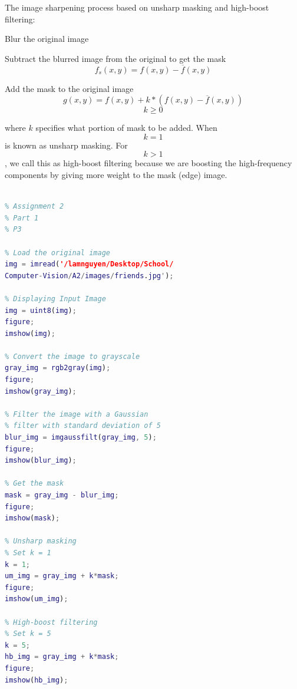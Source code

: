 \documentclass[conference]{IEEEtran}
\begin{document}
The image sharpening process based on unsharp masking and high-boost filtering:
\begin{description}[font=$\bullet$~\normalfont\scshape\color{red!50!black}]
  \item Blur the original image
  \item Subtract the blurred image from the original to get the mask
  \[ f_s(x, y) = f(x, y) - \overline{f}(x, y) \]
  \item Add the mask to the original image
  \[ g(x, y) = f(x, y) +  k*(f(x, y) - \overline{f}(x, y)) \]
  \[ k \geq 0 \]
\end{description}

where \(k\) specifies what portion of mask to be added. When \[ k = 1 \] is known as unsharp masking. For \[ k > 1 \], we call this as high-boost filtering because we are boosting the high-frequency components by giving more weight to the mask (edge) image. 

\begin{lstlisting}[language=Matlab]

% Assignment 2
% Part 1
% P3

% Load the original image
img = imread('/lamnguyen/Desktop/School/
Computer-Vision/A2/images/friends.jpg');

% Displaying Input Image
img = uint8(img);
figure; 
imshow(img); 

% Convert the image to grayscale
gray_img = rgb2gray(img);
figure; 
imshow(gray_img);

% Filter the image with a Gaussian 
% filter with standard deviation of 5
blur_img = imgaussfilt(gray_img, 5);
figure; 
imshow(blur_img);

% Get the mask
mask = gray_img - blur_img;
figure; 
imshow(mask);

% Unsharp masking 
% Set k = 1
k = 1;
um_img = gray_img + k*mask;
figure; 
imshow(um_img);

% High-boost filtering
% Set k = 5
k = 5;
hb_img = gray_img + k*mask;
figure; 
imshow(hb_img);

\end{lstlisting}
\end{document}
